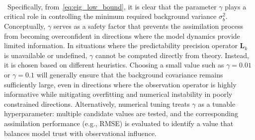 \documentclass[final,1p,times]{elsarticle}
\begin{document}
\\\\\\\\\\\\\\\\\\\\\\\\\\\\\\\\\\\\\\\\\\\\\\\\\\\\\\\\\\\\\\\\\\\\\\\
Specifically, from~\eqref{eq:eig_low_bound}, it is clear that the parameter $ \gamma $ plays a critical role in controlling the minimum required background variance $ \sigma_b^2 $. 
Conceptually, $ \gamma $ serves as a safety factor that prevents the assimilation process from becoming overconfident in directions where the model dynamics provide limited information. 
In situations where the predictability precision operator $ \mathbf{L}_k $ is unavailable or undefined, $ \gamma $ cannot be computed directly from theory. 
Instead, it is chosen based on different heuristics. 
Choosing a small value such as $\gamma = 0.01$ or $\gamma = 0.1$ will generally ensure that the background covariance remains sufficiently large, even in directions where the observation operator is highly informative while mitigating overfitting and numerical instability in poorly constrained directions. 
Alternatively, numerical tuning treats $\gamma$ as a tunable hyperparameter: multiple candidate values are tested, and the corresponding assimilation performance (e.g., RMSE) is evaluated to identify a value that balances model trust with observational influence. 
\end{document}
